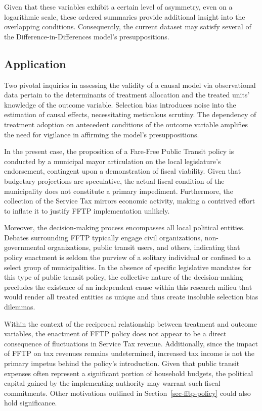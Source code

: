 \documentclass[12pt, a4paper, twoside]{article}
\numberwithin{equation}{subsection} %
\begin{document}
Given that these variables exhibit a certain level of asymmetry, even on
a logarithmic scale, these ordered summaries provide additional insight
into the overlapping conditions. Consequently, the current dataset may
satisfy several of the Difference-in-Differences model's
presuppositions.

\hypertarget{application}{%
\subsection{Application}\label{application}}

Two pivotal inquiries in assessing the validity of a causal model via
observational data pertain to the determinants of treatment allocation
and the treated units' knowledge of the outcome variable. Selection bias
introduces noise into the estimation of causal effects, necessitating
meticulous scrutiny. The dependency of treatment adoption on antecedent
conditions of the outcome variable amplifies the need for vigilance in
affirming the model's presuppositions.

In the present case, the proposition of a Fare-Free Public Transit
policy is conducted by a municipal mayor articulation on the local
legislature's endorsement, contingent upon a demonstration of fiscal
viability. Given that budgetary projections are speculative, the actual
fiscal condition of the municipality does not constitute a primary
impediment. Furthermore, the collection of the Service Tax mirrors
economic activity, making a contrived effort to inflate it to justify
FFTP implementation unlikely.

Moreover, the decision-making process encompasses all local political
entities. Debates surrounding FFTP typically engage civil organizations,
non-governmental organizations, public transit users, and others,
indicating that policy enactment is seldom the purview of a solitary
individual or confined to a select group of municipalities. In the
absence of specific legislative mandates for this type of public transit
policy, the collective nature of the decision-making precludes the
existence of an independent cause within this research milieu that would
render all treated entities as unique and thus create insoluble
selection bias dilemmas.

Within the context of the reciprocal relationship between treatment and
outcome variables, the enactment of FFTP policy does not appear to be a
direct consequence of fluctuations in Service Tax revenue. Additionally,
since the impact of FFTP on tax revenues remains undetermined, increased
tax income is not the primary impetus behind the policy's introduction.
Given that public transit expenses often represent a significant portion
of household budgets, the political capital gained by the implementing
authority may warrant such fiscal commitments. Other motivations
outlined in Section~\ref{sec-fftp-policy} could also hold significance.
\end{document}
